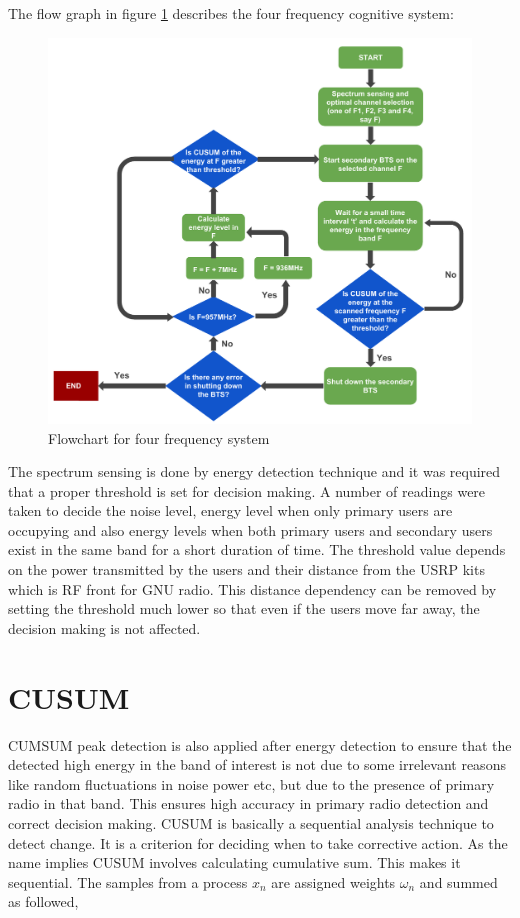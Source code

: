 The flow graph in figure \ref{freqSys4} describes the four frequency cognitive system:

\begin{figure}
\centering
\includegraphics[width=\textwidth]{freqSys4}
\caption[Four frequency system]{Flowchart for four frequency system}
\label{freqSys4}
\end{figure}

The spectrum sensing is done by energy detection technique and it was required 
that a proper threshold is set for decision making. A number of readings were 
taken to decide the noise level, energy level when only primary users are 
occupying and also energy levels when both primary users and secondary users 
exist in the same band for a short duration of time. The threshold value 
depends on the power transmitted by the users and their distance from the USRP 
kits which is RF front for GNU radio. This distance dependency can be removed by 
setting the threshold much lower so that even if the users move 
far away, the decision making is not affected.  





\section{CUSUM}
CUMSUM peak detection is also applied after energy detection to ensure that the
detected high energy in the band of interest is not due to some irrelevant 
reasons like random fluctuations in noise power etc, but due to the presence of 
primary radio in that band. This ensures high accuracy in primary radio 
detection and correct decision making.
CUSUM is basically a sequential analysis technique to detect change. 
It is a criterion for deciding when to take corrective action. As the name 
implies CUSUM involves calculating cumulative sum. This makes it sequential. 
The samples from a process $x_n$  are assigned weights $\omega_n$  and summed 
as followed,

